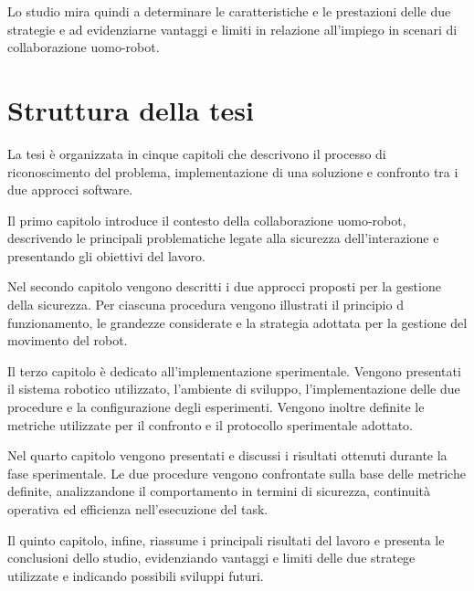 Lo studio mira quindi a determinare le caratteristiche e le prestazioni delle due strategie e ad evidenziarne vantaggi e limiti in relazione all'impiego in scenari di collaborazione uomo-robot.

\section{Struttura della tesi}

La tesi è organizzata in cinque capitoli che descrivono il processo di riconoscimento del problema, implementazione di una soluzione e confronto tra i due approcci software.

Il primo capitolo introduce il contesto della collaborazione uomo-robot, descrivendo le principali problematiche legate alla sicurezza dell'interazione e presentando gli obiettivi del lavoro.

Nel secondo capitolo vengono descritti i due approcci proposti per la gestione della sicurezza. Per ciascuna procedura vengono illustrati il principio d funzionamento, le grandezze considerate e la strategia adottata per la gestione del movimento del robot.

Il terzo capitolo è dedicato all'implementazione sperimentale. Vengono presentati il sistema robotico utilizzato, l'ambiente di sviluppo, l'implementazione delle due procedure e la configurazione degli esperimenti. Vengono inoltre definite le metriche utilizzate per il confronto e il protocollo sperimentale adottato.

Nel quarto capitolo vengono presentati e discussi i risultati ottenuti durante la fase sperimentale. Le due procedure vengono confrontate sulla base delle metriche definite, analizzandone il comportamento in termini di sicurezza, continuità operativa ed efficienza nell'esecuzione del task.

Il quinto capitolo, infine, riassume i principali risultati del lavoro e presenta le conclusioni dello studio, evidenziando vantaggi e limiti delle due stratege utilizzate e indicando possibili sviluppi futuri.